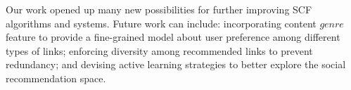 Our work opened up many new possibilities for further improving 
SCF algorithms and systems. Future work can include:
incorporating content $\mathit{genre}$ feature 
to provide a fine-grained model about user preference among different types of links;
enforcing diversity among recommended links to prevent redundancy; and 
devising active learning strategies to better explore the social recommendation
space.

